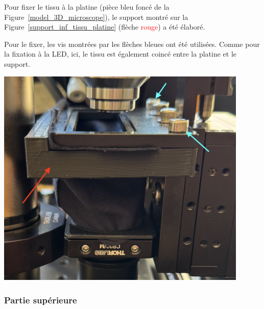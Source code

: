 \begin{minipage}[c]{0.48\textwidth}
    Pour fixer le tissu à la platine (pièce \textcolor[RGB]{30, 50, 150}{bleu foncé} de la Figure~\ref{model_3D_microscope}), le support montré sur la Figure~\ref{support_inf_tissu_platine} (flèche \textcolor{red}{rouge}) a été élaboré.

    \vspace{1em}
    Pour le fixer, les vis montrées par les flèches \textcolor[RGB]{115, 210, 210}{bleues} ont été utilisées. Comme pour la fixation à la LED, ici, le tissu est également coincé entre la platine et le support.
\end{minipage}\hfill
\begin{minipage}[c]{0.48\textwidth}
    \begin{center}
        \includegraphics[width=0.9\textwidth]{assets/figures/Protections_laser/Securite_mecanique/Protection_vers_microscope/support_inf_tissu_platine.jpeg}
    \end{center}
    \label{support_inf_tissu_platine}
\end{minipage}

\subsubsection{Partie supérieure}

